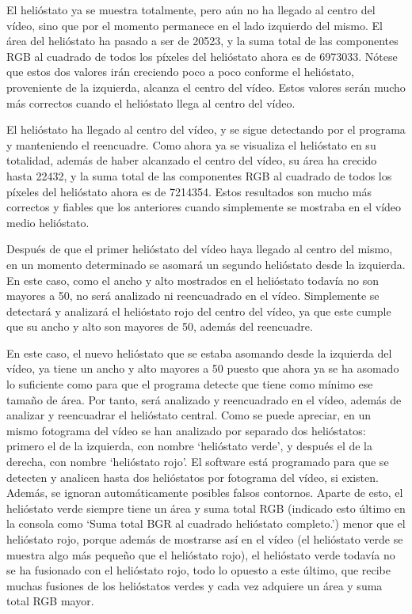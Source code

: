 \documentclass[12pt]{article}
\begin{document}
El helióstato ya se muestra totalmente, pero aún no ha llegado al centro del vídeo, sino que por el momento permanece en el lado izquierdo del mismo. El área del helióstato ha pasado a ser de 20523, y la suma total de las componentes RGB al cuadrado de todos los píxeles del helióstato ahora es de 6973033. Nótese que estos dos valores irán creciendo poco a poco conforme el helióstato, proveniente de la izquierda, alcanza el centro del vídeo. Estos valores serán mucho más correctos cuando el helióstato llega al centro del vídeo.




El helióstato ha llegado al centro del vídeo, y se sigue detectando por el programa y manteniendo el reencuadre. Como ahora ya se visualiza el helióstato en su totalidad, además de haber alcanzado el centro del vídeo, su área ha crecido hasta 22432, y la suma total de las componentes RGB al cuadrado de todos los píxeles del helióstato ahora es de 7214354. Estos resultados son mucho más correctos y fiables que los anteriores cuando simplemente se mostraba en el vídeo medio helióstato.




Después de que el primer helióstato del vídeo haya llegado al centro del mismo, en un momento determinado se asomará un segundo helióstato desde la izquierda. En este caso, como el ancho y alto mostrados en el helióstato todavía no son mayores a 50, no será analizado ni reencuadrado en el vídeo. Simplemente se detectará y analizará el helióstato rojo del centro del vídeo, ya que este cumple que su ancho y alto son mayores de 50, además del reencuadre.




En este caso, el nuevo helióstato que se estaba asomando desde la izquierda del vídeo, ya tiene un ancho y alto mayores a 50 puesto que ahora ya se ha asomado lo suficiente como para que el programa detecte que tiene como mínimo ese tamaño de área. Por tanto, será analizado y reencuadrado en el vídeo, además de analizar y reencuadrar el helióstato central. Como se puede apreciar, en un mismo fotograma del vídeo se han analizado por separado dos helióstatos: primero el de la izquierda, con nombre ‘helióstato verde’, y después el de la derecha, con nombre ‘helióstato rojo’. El software está programado para que se detecten y analicen hasta dos helióstatos por fotograma del vídeo, si existen. Además, se ignoran automáticamente posibles falsos contornos. Aparte de esto, el helióstato verde siempre tiene un área y suma total RGB (indicado esto último en la consola como ‘Suma total BGR al cuadrado helióstato completo.’) menor que el helióstato rojo, porque además de mostrarse así en el vídeo (el helióstato verde se muestra algo más pequeño que el helióstato rojo), el helióstato verde todavía no se ha fusionado con el helióstato rojo, todo lo opuesto a este último, que recibe muchas fusiones de los helióstatos verdes y cada vez adquiere un área y suma total RGB mayor.
\end{document}
